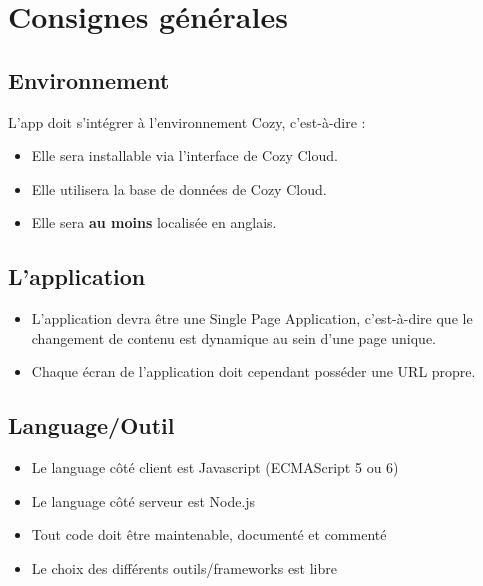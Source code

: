 \documentclass{42-fr}
\begin{document}

\chapter{Consignes g\'en\'erales}


    \section{Environnement}
        L'app doit s'int\'egrer \`a l'environnement Cozy, c'est-\`a-dire :

        \begin{itemize}\itemsep1pt
            \item Elle sera installable via l'interface de Cozy Cloud.
            \item Elle utilisera la base de donn\'ees de Cozy Cloud.
            \item Elle sera \textbf{au moins} localis\'ee en anglais.
        \end{itemize}

    \section{L'application}
        \begin{itemize}\itemsep1pt
            \item L'application devra \^etre une Single Page Application, c'est-\`a-dire
				que le changement de contenu est dynamique au sein d'une page unique.
            \item Chaque écran de l'application doit cependant poss\'eder une URL propre.
        \end{itemize}

    \section{Language/Outil}
        \begin{itemize}\itemsep1pt
            \item Le language c\^ot\'e client est Javascript (ECMAScript 5 ou 6)
            \item Le language c\^ot\'e serveur est Node.js
            \item Tout code doit \^etre maintenable, document\'e et comment\'e
            \item Le choix des diff\'erents outils/frameworks est libre
        \end{itemize}
\end{document}
